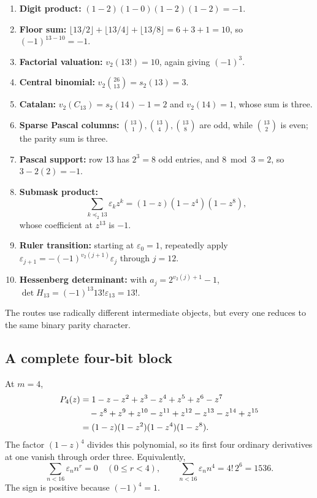 \documentclass[11pt,oneside]{article}
\theoremstyle{definition}
\theoremstyle{remark}
\newcommand{\wt}{s_2}
\newcommand{\vtwo}{v_2}
\newcommand{\eps}{\varepsilon}
\newcommand{\submask}{\mathrel{\preccurlyeq_2}}
\begin{document}
\begin{enumerate}
\item \textbf{Digit product:}
\((1-2)(1-0)(1-2)(1-2)=-1\).
\item \textbf{Floor sum:}
\(\lfloor13/2\rfloor+\lfloor13/4\rfloor+\lfloor13/8\rfloor=6+3+1=10\), so
\((-1)^{13-10}=-1\).
\item \textbf{Factorial valuation:}
\(\vtwo(13!)=10\), again giving \((-1)^3\).
\item \textbf{Central binomial:}
\(\vtwo\binom{26}{13}=\wt(13)=3\).
\item \textbf{Catalan:}
\(\vtwo(C_{13})=\wt(14)-1=2\) and \(\vtwo(14)=1\), whose sum is three.
\item \textbf{Sparse Pascal columns:}
\(\binom{13}{1},\binom{13}{4},\binom{13}{8}\) are odd, while
\(\binom{13}{2}\) is even; the parity sum is three.
\item \textbf{Pascal support:}
row 13 has \(2^3=8\) odd entries, and \(8\bmod3=2\), so
\(3-2(2)=-1\).
\item \textbf{Submask product:}
\[
 \sum_{k\submask13}\eps_kz^k=(1-z)(1-z^4)(1-z^8),
\]
whose coefficient at \(z^{13}\) is \(-1\).
\item \textbf{Ruler transition:}
starting at \(\eps_0=1\), repeatedly apply
\(\eps_{j+1}=-(-1)^{\vtwo(j+1)}\eps_j\) through \(j=12\).
\item \textbf{Hessenberg determinant:}
with \(a_j=2^{\vtwo(j)+1}-1\),
\(\det H_{13}=(-1)^{13}13!\eps_{13}=13!\).
\end{enumerate}
The routes use radically different intermediate objects, but every one reduces to the same
binary parity character.

\subsection{A complete four-bit block}

At \(m=4\),
\begin{align}
  P_4(z)
  &=1-z-z^2+z^3-z^4+z^5+z^6-z^7                     \notag\\
  &\quad{}-z^8+z^9+z^{10}-z^{11}+z^{12}-z^{13}-z^{14}+z^{15}                  \notag\\
  &=(1-z)(1-z^2)(1-z^4)(1-z^8).                          \label{eq:P4-example}
\end{align}
The factor \((1-z)^4\) divides this polynomial, so its first four ordinary derivatives at
one vanish through order three.  Equivalently,
\begin{equation}
  \sum_{n<16}\eps_nn^r=0\quad(0\le r<4),
  \qquad
  \sum_{n<16}\eps_nn^4=4!\,2^6=1536.                       \label{eq:P4-moments}
\end{equation}
The sign is positive because \((-1)^4=1\).
\end{document}
